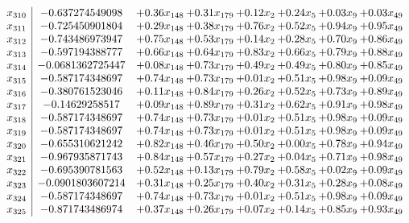\documentclass[8pt]{article}
\begin{document}
\[\begin{array}{c| c c@{\hskip 2pt} c@{\hskip 2pt} c@{\hskip 2pt} c@{\hskip 2pt} c@{\hskip 2pt} c@{\hskip 2pt} }
 x_{310}   &  -0.637274549098 & +  0.36 x_{148} & +  0.31 x_{179} & +  0.12 x_{2} & +  0.24 x_{5} & +  0.03 x_{9} & +  0.03 x_{49}\\
 x_{311}   &  -0.725450901804 & +  0.29 x_{148} & +  0.38 x_{179} & +  0.76 x_{2} & +  0.52 x_{5} & +  0.94 x_{9} & +  0.95 x_{49}\\
 x_{312}   &  -0.743486973947 & +  0.75 x_{148} & +  0.53 x_{179} & +  0.14 x_{2} & +  0.28 x_{5} & +  0.70 x_{9} & +  0.86 x_{49}\\
 x_{313}   &  -0.597194388777 & +  0.66 x_{148} & +  0.64 x_{179} & +  0.83 x_{2} & +  0.66 x_{5} & +  0.79 x_{9} & +  0.88 x_{49}\\
 x_{314}   &  -0.0681362725447 & +  0.08 x_{148} & +  0.73 x_{179} & +  0.49 x_{2} & +  0.49 x_{5} & +  0.80 x_{9} & +  0.85 x_{49}\\
 x_{315}   &  -0.587174348697 & +  0.74 x_{148} & +  0.73 x_{179} & +  0.01 x_{2} & +  0.51 x_{5} & +  0.98 x_{9} & +  0.09 x_{49}\\
 x_{316}   &  -0.380761523046 & +  0.11 x_{148} & +  0.84 x_{179} & +  0.26 x_{2} & +  0.52 x_{5} & +  0.73 x_{9} & +  0.89 x_{49}\\
 x_{317}   &  -0.14629258517 & +  0.09 x_{148} & +  0.89 x_{179} & +  0.31 x_{2} & +  0.62 x_{5} & +  0.91 x_{9} & +  0.98 x_{49}\\
 x_{318}   &  -0.587174348697 & +  0.74 x_{148} & +  0.73 x_{179} & +  0.01 x_{2} & +  0.51 x_{5} & +  0.98 x_{9} & +  0.09 x_{49}\\
 x_{319}   &  -0.587174348697 & +  0.74 x_{148} & +  0.73 x_{179} & +  0.01 x_{2} & +  0.51 x_{5} & +  0.98 x_{9} & +  0.09 x_{49}\\
 x_{320}   &  -0.655310621242 & +  0.82 x_{148} & +  0.46 x_{179} & +  0.50 x_{2} & +  0.00 x_{5} & +  0.78 x_{9} & +  0.94 x_{49}\\
 x_{321}   &  -0.967935871743 & +  0.84 x_{148} & +  0.57 x_{179} & +  0.27 x_{2} & +  0.04 x_{5} & +  0.71 x_{9} & +  0.98 x_{49}\\
 x_{322}   &  -0.695390781563 & +  0.52 x_{148} & +  0.13 x_{179} & +  0.79 x_{2} & +  0.58 x_{5} & +  0.02 x_{9} & +  0.09 x_{49}\\
 x_{323}   &  -0.0901803607214 & +  0.31 x_{148} & +  0.25 x_{179} & +  0.40 x_{2} & +  0.31 x_{5} & +  0.28 x_{9} & +  0.08 x_{49}\\
 x_{324}   &  -0.587174348697 & +  0.74 x_{148} & +  0.73 x_{179} & +  0.01 x_{2} & +  0.51 x_{5} & +  0.98 x_{9} & +  0.09 x_{49}\\
 x_{325}   &  -0.871743486974 & +  0.37 x_{148} & +  0.26 x_{179} & +  0.07 x_{2} & +  0.14 x_{5} & +  0.85 x_{9} & +  0.93 x_{49}\\

\end{array}\]
\end{document}
